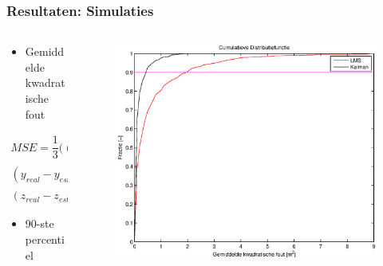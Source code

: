 \documentclass{beamer}
\begin{document}
\begin{frame}
\begin{columns}[c]
\begin{column}{.5\textwidth}
\begin{figure}
\begin{center}
          \end{center}
        \end{figure}
      \end{column}
    \end{columns}
  \end{frame}
  
  \begin{frame}
    \frametitle{Resultaten: Simulaties}
    \begin{columns}[c]
  \begin{column}{0.5\textwidth}
    \begin{itemize}
      \item Gemiddelde kwadratische fout
      \end{itemize}
      \begin{equation*}
      \begin{split}
MSE = \dfrac{1}{3}((x_{real}-x_{est})^2+\\(y_{real}-y_{est})^2+\\(z_{real}-z_{est})^2 )
\end{split}
\end{equation*}
\begin{itemize}
      \item 90-ste percentiel
    \end{itemize}
    \end{column}

    \begin{column}{0.5\textwidth}
    \begin{figure}
      \begin{center}
        \includegraphics[width=1\linewidth]{images/simulatie_cumulatief.eps}
      \end{center}
    \end{figure}
    \end{column}
    \end{columns}

  \end{frame}
  
\end{document}
